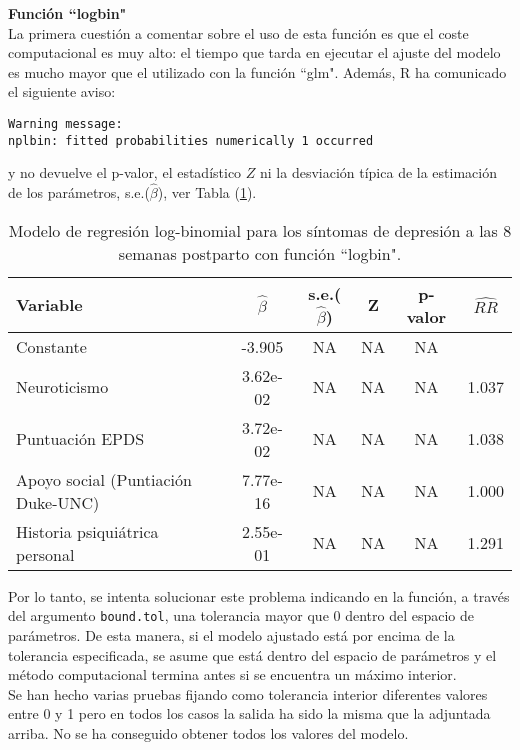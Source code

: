  \textbf{Función ``logbin"}\\
[0.3cm]
La primera cuestión a comentar sobre el uso de esta función es que el coste computacional es muy alto: el tiempo que tarda en ejecutar el ajuste del modelo es mucho mayor que el utilizado con la función ``glm". Además, R ha comunicado el siguiente aviso:

\begin{Verbatim}[xleftmargin=2.5cm]
Warning message:
nplbin: fitted probabilities numerically 1 occurred 
\end{Verbatim}

y no devuelve el p-valor, el estadístico $Z$ ni la desviación típica de la estimación de los parámetros, s.e.($\hat{\beta}$), ver Tabla (\ref{tab:11}). 
\begin{table} [H]
	\centering
	\begin{tabular}{l c c c c c}
		\toprule
		\textbf{Variable} & $\hat{\beta}$ & s.e.($\hat{\beta}$) & Z & p-valor & $\widehat{RR}$\\
		\midrule
		Constante &  -3.905 & NA  & NA &NA &  \\
		Neuroticismo &  3.62e-02   & NA  & NA &NA &1.037  \\
		Puntuación EPDS &  3.72e-02 & NA  & NA &NA &1.038 \\
		Apoyo social (Puntiación Duke-UNC)& 7.77e-16   & NA  & NA &NA& 1.000 \\
		Historia psiquiátrica personal & 2.55e-01  & NA  & NA &NA  &1.291 \\
		\bottomrule
	\end{tabular}
	\caption{Modelo de regresión log-binomial para los síntomas de depresión a las 8 semanas postparto con función ``logbin".}
	\label{tab:11}
\end{table}

Por lo tanto, se intenta solucionar este problema indicando en la función, a través del argumento \lstinline{bound.tol}, una tolerancia mayor que 0 dentro del espacio de parámetros. De esta manera, si el modelo ajustado está por encima de la tolerancia especificada, se asume que está dentro del espacio de parámetros y el método computacional termina antes si se encuentra un máximo interior.  \\

Se han hecho varias pruebas fijando como tolerancia interior diferentes valores entre 0 y 1 pero en todos los casos la salida ha sido la misma que la adjuntada arriba. No se ha conseguido obtener todos los valores del modelo.\\


